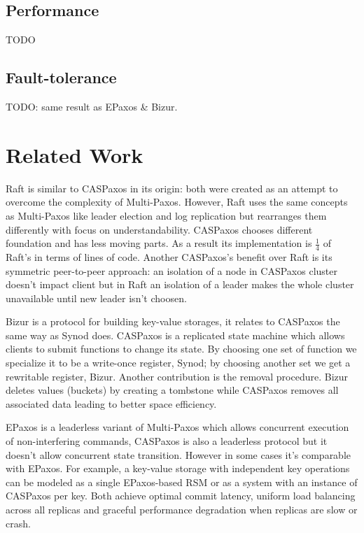\documentclass[12pt]{article}
\theoremstyle{definition}
\begin{document}
\subsection{Performance}

TODO

\subsection{Fault-tolerance}

TODO: same result as EPaxos \& Bizur.

\section{Related Work}

Raft is similar to CASPaxos in its origin: both were created as an attempt to overcome the complexity of Multi-Paxos. However, Raft uses the same concepts as Multi-Paxos like leader election and log replication but rearranges them differently with focus on understandability. CASPaxos chooses different foundation and has less moving parts. As a result its implementation is $\frac{1}{4}$ of Raft's in terms of lines of code. Another CASPaxos's benefit over Raft is its symmetric peer-to-peer approach: an isolation of a node in CASPaxos cluster doesn't impact client but in Raft an isolation of a leader makes the whole cluster unavailable until new leader isn't choosen.

Bizur is a protocol for building key-value storages, it relates to CASPaxos the same way as Synod does. CASPaxos is a replicated state machine which allows clients to submit functions to change its state. By choosing one set of function we specialize it to be a write-once register, Synod; by choosing another set we get a rewritable register, Bizur. Another contribution is the removal procedure. Bizur deletes values (buckets) by creating a tombstone while CASPaxos removes all associated data leading to better space efficiency.

EPaxos is a leaderless variant of Multi-Paxos which allows concurrent execution of non-interfering commands, CASPaxos is also a leaderless protocol but it doesn't allow concurrent state transition. However in some cases it's comparable with EPaxos. For example, a key-value storage with independent key operations can be modeled as a single EPaxos-based RSM or as a system with an instance of CASPaxos per key. Both achieve optimal commit latency, uniform load balancing across all replicas and graceful performance degradation when replicas are slow or crash.
\end{document}
